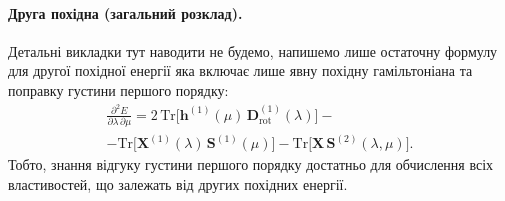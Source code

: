 \paragraph{Друга похідна (загальний розклад).}
%

Детальні викладки тут наводити не будемо, напишемо лише остаточну формулу
для другої похідної енергії
яка включає лише явну похідну гамільтоніана
та поправку густини першого порядку:
\begin{multline}\label{eq:d2Edlambda2}
\frac{\partial^2E}{\partial\lambda\,\partial\mu}
= 2\,\mathrm{Tr} \big[\mathbf h^{(1)}(\mu)\,\mathbf D^{(1)}_\text{rot}(\lambda)\big] - \\
- \mathrm{Tr} \big[\mathbf X^{(1)}(\lambda)\,\mathbf S^{(1)}(\mu)\big]
- \mathrm{Tr} \big[\mathbf X\,\mathbf S^{(2)}(\lambda,\mu)\big].
\end{multline}
Тобто, знання відгуку густини першого порядку
достатньо для обчислення всіх властивостей,
що залежать від других похідних енергії.

